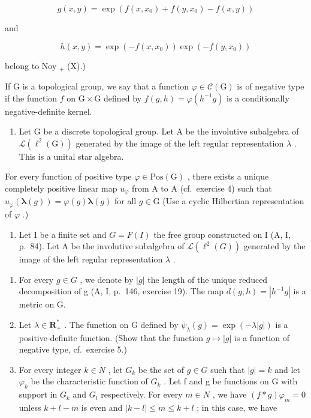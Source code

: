 \[
g (x, y) = \exp (f (x, x _ {0}) + f (y, x _ {0}) - f (x, y))
\]

and

\[
h (x, y) = \exp (- f (x, x _ {0})) \exp (- f (y, x _ {0}))
\]

belong to Noy \(_{+}\) (X).)

If G is a topological group, we say that a function \(\varphi \in \mathcal{C}(\mathrm{G})\) is of negative type if the function \(f\) on \(\mathrm{G} \times \mathrm{G}\) defined by \(f(g,h) = \varphi(h^{-1}g)\) is a conditionally negative-definite kernel.

\begin{enumerate}
\def\labelenumi{\arabic{enumi})}
\setcounter{enumi}{5}
\tightlist
\item
  Let G be a discrete topological group. Let A be the involutive subalgebra of \(\mathcal{L}(\ell^{2}(\mathrm{G}))\) generated by the image of the left regular representation \(\lambda\) . This is a unital star algebra.
\end{enumerate}

For every function of positive type \(\varphi\in\mathrm{Pos}(\mathrm{G})\) , there exists a unique completely positive linear map \(u_{\varphi}\) from A to A (cf.~exercise 4) such that \(u_{\varphi}(\boldsymbol{\lambda}(g))=\varphi(g)\boldsymbol{\lambda}(g)\) for all \(g\in\mathrm{G}\) (Use a cyclic Hilbertian representation of \(\varphi\) .)

\begin{enumerate}
\def\labelenumi{\arabic{enumi})}
\setcounter{enumi}{6}
\tightlist
\item
  Let I be a finite set and \(G = F(I)\) the free group constructed on I (A, I, p.~84). Let A be the involutive subalgebra of \(\mathcal{L}(\ell^{2}(G))\) generated by the image of the left regular representation \(\lambda\) .
\end{enumerate}

\begin{enumerate}
\def\labelenumi{\alph{enumi})}
\item
  For every \(g \in G\) , we denote by \(|g|\) the length of the unique reduced decomposition of g (A, I, p.~146, exercise 19). The map \(d(g, h) = |h^{-1}g|\) is a metric on G.
\item
  Let \(\lambda \in \mathbf{R}_{+}^{*}\) . The function on G defined by \(\psi_{\lambda}(g) = \exp(-\lambda|g|)\) is a positive-definite function. (Show that the function \(g \mapsto |g|\) is a function of negative type, cf.~exercise 5.)
\item
  For every integer \(k \in N\) , let \(G_{k}\) be the set of \(g \in G\) such that \(|g| = k\) and let \(\varphi_{k}\) be the characteristic function of \(G_{k}\) . Let f and g be functions on G with support in \(G_{k}\) and \(G_{l}\) respectively. For every \(m \in N\) , we have \((f * g)\varphi_{m} = 0\) unless \(k + l - m\) is even and \(|k - l| \leqslant m \leqslant k + l\) ; in this case, we have
\end{enumerate}

